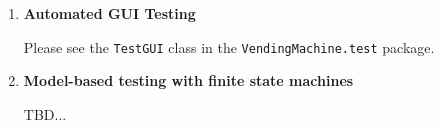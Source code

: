\documentclass{report}
\begin{document}
\begin{enumerate}
	\item \textbf{Automated GUI Testing}
	
	Please see the \texttt{TestGUI} class in the \texttt{VendingMachine.test} package.
	
	\item \textbf{Model-based testing with finite state machines}
	
	TBD...
	
\end{enumerate}
\end{document}
